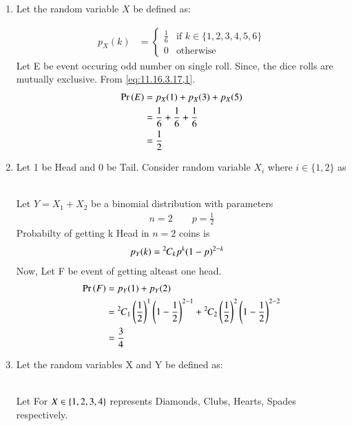 \documentclass[journal,12pt,twocolumn]{IEEEtran}
\theoremstyle{remark}
\begin{document}
\begin{enumerate}
\item Let the random variable $X$ be defined as:
\begin{table}[!ht]
	
\end{table}
   \begin{align}
        p_X(k) &= 
        \begin{cases}
            \frac{1}{6} & \text{if }k \in \{1, 2, 3, 4, 5, 6\}\\
            0 & \text{otherwise}
        \end{cases}\label{eq:11.16.3.17,1}
    \end{align}
 Let E be event occuring odd number on single roll. Since, the dice rolls are mutually exclusive. From \eqref{eq:11.16.3.17,1}.
 \begin{align}
 \Pr\left(E\right)&=p_X(1)+p_X(3)+p_X(5)\\
 &=\frac{1}{6}+\frac{1}{6}+\frac{1}{6}\\
 &=\frac{1}{2} 
 \end{align}
 \item Let 1 be Head and 0 be Tail. Consider random variable $X_i$ where $i \in \{1,2\}$ as
 \begin{table}[!ht]
	
\end{table}\\
Let $Y=X_1+X_2$ be a binomial distribution with parameters
\begin{align}
n=2 \qquad p=\frac{1}{2}
\end{align}
Probabilty of getting k Head in $n=2$ coins is
\begin{align}
p_Y(k)&={{}^{2}\mkern-1muC_{k}}p^k(1-p)^{2-k}
\end{align}
Now, Let F be event of getting alteast one head.
\begin{align}
\Pr\left(F\right)&=p_Y(1)+p_Y(2)\\
&={{}^{2}\mkern-1muC_{1}}\left(\frac{1}{2}\right)^1\left(1-\frac{1}{2}\right)^{2-1}+{{}^{2}\mkern-1muC_{2}}\left(\frac{1}{2}\right)^2\left(1-\frac{1}{2}\right)^{2-2}\\
&=\frac{3}{4}
\end{align}
\item Let the random variables X and Y be defined as:
\begin{table}[!ht]
	
\end{table}\\
Let For $X \in \left\{1,2,3,4\right\}$ represents Diamonds, Clubs, Hearts, Spades respectively.

\end{enumerate}
\end{document}
